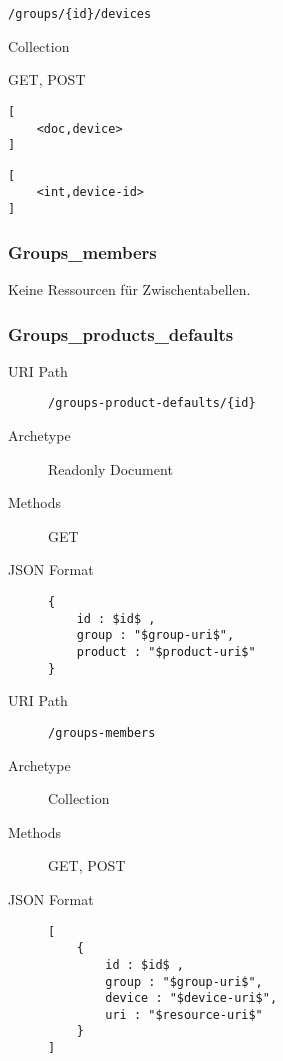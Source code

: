 \documentclass[10pt,a4paper]{scrartcl}
\begin{document}
\begin{mdframed}[style=def]
\begin{description*}
	\item[URI Path] \texttt{/groups/\{id\}/devices}
	\item[Archetype] Collection
	\item[Methods] GET, POST
	\item[JSON Format Response] \hfill
\begin{lstlisting}
[
	<doc,device>
]
\end{lstlisting}
	\item[JSON Format Request] \hfill
\begin{lstlisting}
[
	<int,device-id>
]
\end{lstlisting}
\end{description*}
\end{mdframed}


\pagebreak
\subsubsection{Groups\_members}

Keine Ressourcen für Zwischentabellen.

\pagebreak
\subsubsection{Groups\_products\_defaults}

\begin{mdframed}[style=def]
\begin{description}
	\item[URI Path] \texttt{/groups-product-defaults/\{id\}}
	\item[Archetype] Readonly Document
	\item[Methods] GET
	\item[JSON Format] \hfill
\begin{lstlisting}
{
	id : $id$ ,
	group : "$group-uri$",
	product : "$product-uri$"
}
\end{lstlisting}
\end{description}
\end{mdframed}

\begin{mdframed}[style=def]
\begin{description}
	\item[URI Path] \texttt{/groups-members}
	\item[Archetype] Collection
	\item[Methods] GET, POST
	\item[JSON Format] \hfill
\begin{lstlisting}
[
	{
		id : $id$ ,
		group : "$group-uri$",
		device : "$device-uri$",
		uri : "$resource-uri$"
	}
]
\end{lstlisting}
\end{description}
\end{mdframed}
\end{document}

